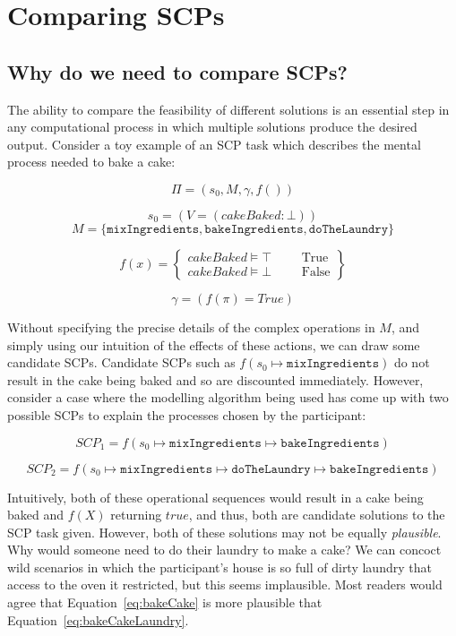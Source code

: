 \chapter{Comparing SCPs} \label{chp:comparing}
\section{Why do we need to compare SCPs?} \label{sec:whyCompare}
The ability to compare the feasibility of different solutions is an essential step in any computational process in which multiple solutions produce the desired output. Consider a toy example of an SCP task which describes the mental process needed to bake a cake:

\[
\Pi = (s_0, M, \gamma, f())
\]

\[
s_0 = (V=(cakeBaked: \bot) )
\]
\[
M=\{\texttt{mixIngredients}, \texttt{bakeIngredients}, \texttt{doTheLaundry}\}
\]

\[
f(x)= \left\{ \begin{split} cakeBaked \models \top & & & \textrm{True}\\ cakeBaked \models \bot & & & \textrm{False} \end{split} \right\}
\]

\[
\gamma = (f(\pi) = True)
\]

Without specifying the precise details of the complex operations in $M$, and simply using our intuition of the effects of these actions, we can draw some candidate SCPs. Candidate SCPs such as $f(s_0 \longmapsto \texttt{mixIngredients})$ do not result in the cake being baked and so are discounted immediately. However, consider a case where the modelling algorithm being used has come up with two possible SCPs to explain the processes chosen by the participant:

\begin{equation} \label{eq:bakeCake}
SCP_1 = f(s_0\longmapsto \texttt{mixIngredients} \longmapsto \texttt{bakeIngredients})
\end{equation}

\begin{equation} \label{eq:bakeCakeLaundry}
SCP_2 = f(s_0 \longmapsto \texttt{mixIngredients} \longmapsto  \texttt{doTheLaundry} \longmapsto \texttt{bakeIngredients})
\end{equation}

Intuitively, both of these operational sequences would result in a cake being baked and $f(X)$ returning $true$, and thus, both are candidate solutions to the SCP task given. However, both of these solutions may not be equally \textit{plausible}. Why would someone need to do their laundry to make a cake? We can concoct wild scenarios in which the participant's house is so full of dirty laundry that access to the oven it restricted, but this seems implausible. Most readers would agree that Equation~\ref{eq:bakeCake} is more plausible that Equation~\ref{eq:bakeCakeLaundry}.

